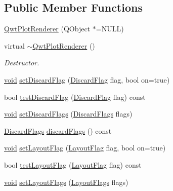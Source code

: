 \subsection*{Public Member Functions}
\begin{DoxyCompactItemize}
\item 
\hyperlink{class_qwt_plot_renderer_aa265be7e2873a28dbb4f1788020cebe6}{Qwt\-Plot\-Renderer} (Q\-Object $\ast$=N\-U\-L\-L)
\item 
virtual \hyperlink{class_qwt_plot_renderer_a572bea1c8400ba75c01d0bb8bdf391c3}{$\sim$\-Qwt\-Plot\-Renderer} ()
\begin{DoxyCompactList}\small\item\em Destructor. \end{DoxyCompactList}\item 
\hyperlink{group___u_a_v_objects_plugin_ga444cf2ff3f0ecbe028adce838d373f5c}{void} \hyperlink{class_qwt_plot_renderer_a33439eb1407f3ba78fdd7b50461bbafc}{set\-Discard\-Flag} (\hyperlink{class_qwt_plot_renderer_a34d2aa9911e93cb7871e6ce4210e41cd}{Discard\-Flag} flag, bool on=true)
\item 
bool \hyperlink{class_qwt_plot_renderer_a04fe5d9c1d81b6bfc307f8a90b4ff5c3}{test\-Discard\-Flag} (\hyperlink{class_qwt_plot_renderer_a34d2aa9911e93cb7871e6ce4210e41cd}{Discard\-Flag} flag) const 
\item 
\hyperlink{group___u_a_v_objects_plugin_ga444cf2ff3f0ecbe028adce838d373f5c}{void} \hyperlink{class_qwt_plot_renderer_ac618f4d6605c2484c03140323e1bd639}{set\-Discard\-Flags} (\hyperlink{class_qwt_plot_renderer_aa61638c08ef926c0148dd12c9f830b2d}{Discard\-Flags} flags)
\item 
\hyperlink{class_qwt_plot_renderer_aa61638c08ef926c0148dd12c9f830b2d}{Discard\-Flags} \hyperlink{class_qwt_plot_renderer_ac0965a5084598e011ef1eb5c0d12347f}{discard\-Flags} () const 
\item 
\hyperlink{group___u_a_v_objects_plugin_ga444cf2ff3f0ecbe028adce838d373f5c}{void} \hyperlink{class_qwt_plot_renderer_ab06e26ebf2038b55e5f30bb14c90caec}{set\-Layout\-Flag} (\hyperlink{class_qwt_plot_renderer_a111b4db55d3f620a33e75f6b398e4b4a}{Layout\-Flag} flag, bool on=true)
\item 
bool \hyperlink{class_qwt_plot_renderer_a4e58ce0389b485c0d1014a13c2bdd0f7}{test\-Layout\-Flag} (\hyperlink{class_qwt_plot_renderer_a111b4db55d3f620a33e75f6b398e4b4a}{Layout\-Flag} flag) const 
\item 
\hyperlink{group___u_a_v_objects_plugin_ga444cf2ff3f0ecbe028adce838d373f5c}{void} \hyperlink{class_qwt_plot_renderer_a475ee59a0a3078380b6da31567bd0a14}{set\-Layout\-Flags} (\hyperlink{class_qwt_plot_renderer_a20cf36bbea6b03a023d34c25b8b4b295}{Layout\-Flags} flags)

\end{DoxyCompactItemize}

